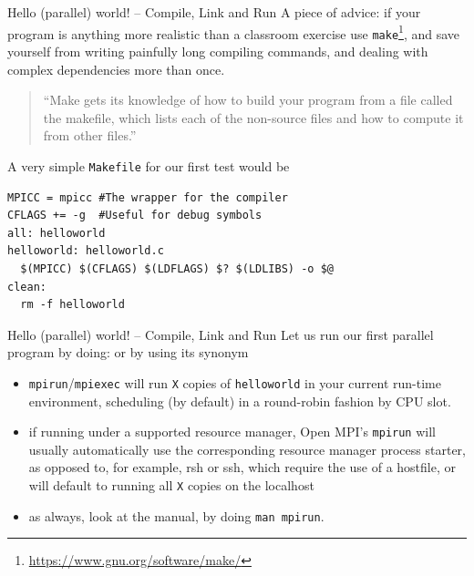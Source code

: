 \documentclass{beamer}
\begin{document}
\begin{frame}[fragile]{Hello (parallel) world! -- Compile, Link and Run}
A piece of advice: if your program is anything more realistic than a classroom exercise use \texttt{make}\footnote{\url{https://www.gnu.org/software/make/}}, and save yourself from writing painfully long compiling commands, and dealing with complex dependencies more than once.

\begin{quote}
``Make gets its knowledge of how to build your program from a file called the makefile, which lists each of the non-source files and how to compute it from other files.''
\end{quote}

A very simple \texttt{Makefile} for our first test would be
\begin{verbatim}
MPICC = mpicc #The wrapper for the compiler
CFLAGS += -g  #Useful for debug symbols
all: helloworld
helloworld: helloworld.c
  $(MPICC) $(CFLAGS) $(LDFLAGS) $? $(LDLIBS) -o $@
clean:
  rm -f helloworld
\end{verbatim}
\end{frame}

\begin{frame}[fragile]{Hello (parallel) world! -- Compile, Link and Run}
Let us run our first parallel program by doing:
or by using its synonym
\begin{itemize}
	\item<1-> \texttt{mpirun}/\texttt{mpiexec} will  run  \texttt{X} copies of \texttt{helloworld} in your current run-time environment, scheduling (by default) in a round-robin fashion by CPU slot.
	\item<1-> if running under a supported resource manager, Open MPI's \texttt{mpirun} will usually automatically use the corresponding resource manager process starter, as opposed to, for example, rsh or ssh, which require the use of a hostfile, or will default  to  running all \texttt{X} copies on the localhost 
	\item<2-> as always, look at the manual, by doing \texttt{man mpirun}.
\end{itemize}

\end{frame}
\end{document}
